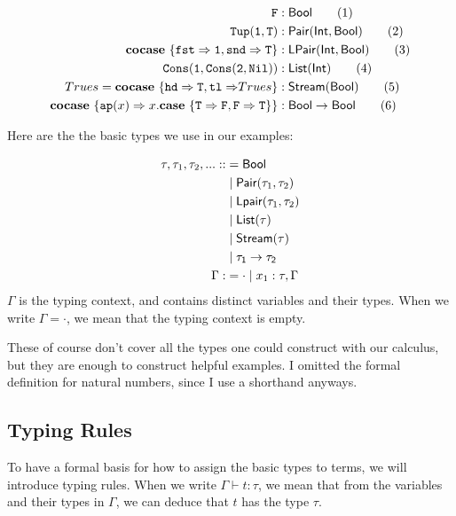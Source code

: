 \documentclass[twoside,12pt,a4paper]{article}
\begin{document}
\begin{example}
    \begin{align*}
        \mathtt{F}&: \mathsf{Bool}\tag{1}\\
        \mathtt{Tup(1,T)}&: \mathsf{Pair(Int, Bool)}\tag{2}\\
        \textbf{cocase}\ \{\mathtt{fst \Rightarrow 1, snd\Rightarrow T}\}&: \mathsf{LPair(Int, Bool)}\tag{3}\\
        \mathtt{Cons(1, Cons(2, Nil))}&: \mathsf{List(Int)}\tag{4}\\
        Trues = \textbf{cocase}\ \{\mathtt{hd \Rightarrow T, tl \Rightarrow} Trues\}&: \mathsf{Stream(Bool)}\tag{5}\\
        \textbf{cocase}\ \{\texttt{ap}(x)\Rightarrow x.\textbf{case}\ \{\mathtt{T\Rightarrow F, F \Rightarrow T}\}\}&: \mathsf{Bool \rightarrow Bool}\tag{6}    \end{align*}    
\end{example}
Here are the the basic types we use in our examples:
\begin{definition}
    \begin{align*}
        \tau, \tau_1, \tau_2, ... ::&= \mathsf{Bool} \\
        &\;|\; \mathsf{Pair(}\tau_1, \tau_2\mathsf{)}\\
        &\;|\; \mathsf{Lpair(}\tau_1, \tau_2\mathsf{)}\\
        &\;|\; \mathsf{List(}\tau\mathsf{)}\\
        &\;|\; \mathsf{Stream(}\tau\mathsf{)}\\
        &\;|\; \mathsf{\tau_1 \rightarrow \tau_2}\\
        \Gamma :&= \cdot \;|\; x_1:\tau, \Gamma
    \end{align*}
    $\Gamma$ is the typing context, and contains distinct variables and their types.
    When we write $\Gamma = \cdot$, we mean that the typing context is empty.
\end{definition}
These of course don't cover all the types one could construct with our calculus, but they are enough to construct helpful examples.
I omitted the formal definition for natural numbers, since I use a shorthand anyways.

\subsection{Typing Rules}
To have a formal basis for how to assign the basic types to terms, we will introduce typing rules. 
When we write $\Gamma\vdash t:\tau$, we mean that from the variables and their types in $\Gamma$, 
we can deduce that $t$ has the type $\tau$.
\end{document}
